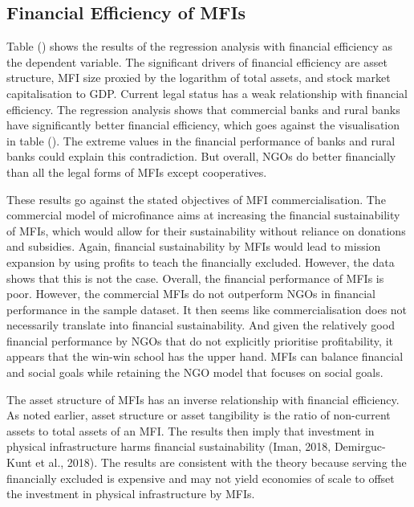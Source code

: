\documentclass[
]{article}
\begin{document}
\hypertarget{financial-efficiency-of-mfis}{%
\subsection{Financial Efficiency of
MFIs}\label{financial-efficiency-of-mfis}}

Table () shows the results of the regression analysis with financial
efficiency as the dependent variable. The significant drivers of
financial efficiency are asset structure, MFI size proxied by the
logarithm of total assets, and stock market capitalisation to GDP.
Current legal status has a weak relationship with financial efficiency.
The regression analysis shows that commercial banks and rural banks have
significantly better financial efficiency, which goes against the
visualisation in table (). The extreme values in the financial
performance of banks and rural banks could explain this contradiction.
But overall, NGOs do better financially than all the legal forms of MFIs
except cooperatives.

These results go against the stated objectives of MFI commercialisation.
The commercial model of microfinance aims at increasing the financial
sustainability of MFIs, which would allow for their sustainability
without reliance on donations and subsidies. Again, financial
sustainability by MFIs would lead to mission expansion by using profits
to teach the financially excluded. However, the data shows that this is
not the case. Overall, the financial performance of MFIs is poor.
However, the commercial MFIs do not outperform NGOs in financial
performance in the sample dataset. It then seems like commercialisation
does not necessarily translate into financial sustainability. And given
the relatively good financial performance by NGOs that do not explicitly
prioritise profitability, it appears that the win-win school has the
upper hand. MFIs can balance financial and social goals while retaining
the NGO model that focuses on social goals.

The asset structure of MFIs has an inverse relationship with financial
efficiency. As noted earlier, asset structure or asset tangibility is
the ratio of non-current assets to total assets of an MFI. The results
then imply that investment in physical infrastructure harms financial
sustainability (Iman, 2018, Demirguc-Kunt et al., 2018). The results are
consistent with the theory because serving the financially excluded is
expensive and may not yield economies of scale to offset the investment
in physical infrastructure by MFIs.
\end{document}
